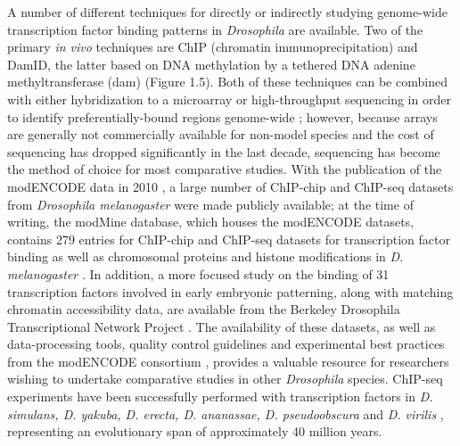 A number of different techniques for directly or indirectly studying genome-wide transcription factor binding patterns in \emph{Drosophila} are available. Two of the primary \emph{in vivo} techniques are ChIP (chromatin immunoprecipitation) and DamID, the latter based on DNA methylation by a tethered DNA adenine methyltransferase (dam) \citep{greil_[16]_2006} (Figure 1.5). Both of these techniques can be combined with either hybridization to a microarray or high-throughput sequencing in order to identify preferentially-bound regions genome-wide \citep{aleksic_chiping_2009,van_steensel_chromatin_2001}; however, because arrays are generally not commercially available for non-model species and the cost of sequencing has dropped significantly in the last decade, sequencing has become the method of choice for most comparative studies. With the publication of the modENCODE data in 2010 \citep{the_modencode_consortium_identification_2010}, a large number of ChIP-chip and ChIP-seq datasets from \emph{Drosophila melanogaster} were made publicly available; at the time of writing, the modMine database, which houses the modENCODE datasets, contains 279 entries for ChIP-chip and ChIP-seq datasets for transcription factor binding as well as chromosomal proteins and histone modifications in \emph{D. melanogaster} \citep{contrino_modmine:_2011}. In addition, a more focused study on the binding of 31 transcription factors involved in early embryonic patterning, along with matching chromatin accessibility data, are available from the Berkeley Drosophila Transcriptional Network Project \citep{macarthur_developmental_2009}. The availability of these datasets, as well as data-processing tools, quality control guidelines and experimental best practices from the modENCODE consortium \citep{landt_chip-seq_2012,trinh_cloud-based_2013}, provides a valuable resource for researchers wishing to undertake comparative studies in other \emph{Drosophila} species. ChIP-seq experiments have been successfully performed with transcription factors in \emph{D. simulans, D. yakuba, D. erecta, D. ananassae, D. pseudoobscura} and \emph{D. virilis} \citep{bradley_binding_2010,he_high_2011,paris_extensive_2013,villar_evolution_2014}, representing an evolutionary span of approximately 40 million years.\\

